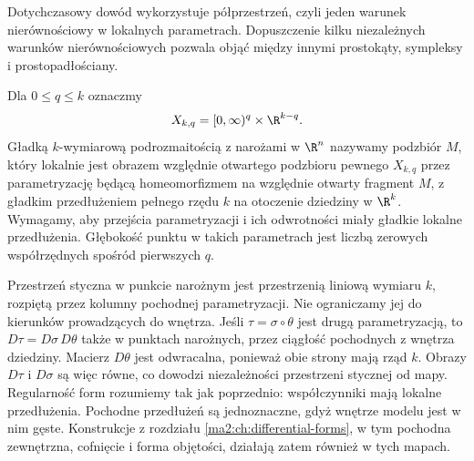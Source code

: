 Dotychczasowy dowód wykorzystuje półprzestrzeń,
czyli jeden warunek nierównościowy w lokalnych
parametrach. Dopuszczenie kilku niezależnych
warunków nierównościowych pozwala objąć między
innymi prostokąty, sympleksy i prostopadłościany.

\begin{definicja}
\label{ma2:def:stokes-corners}
Dla $0\le q\le k$ oznaczmy
\[
 X_{k,q}=[0,\infty)^q\times\R^{k-q}.
\]
Gładką $k$-wymiarową podrozmaitością z narożami
w $\R^n$ nazywamy podzbiór $M$, który lokalnie
jest obrazem względnie otwartego podzbioru
pewnego $X_{k,q}$ przez parametryzację będącą
homeomorfizmem na względnie otwarty fragment $M$,
z gładkim przedłużeniem pełnego rzędu $k$
na otoczenie dziedziny w $\R^k$.
Wymagamy, aby przejścia parametryzacji i ich
odwrotności miały gładkie lokalne przedłużenia.
Głębokość punktu w takich parametrach jest
liczbą zerowych współrzędnych spośród pierwszych $q$.
\end{definicja}

Przestrzeń styczna w punkcie narożnym jest
przestrzenią liniową wymiaru $k$, rozpiętą przez
kolumny pochodnej parametryzacji. Nie ograniczamy
jej do kierunków prowadzących do wnętrza.
Jeśli $\tau=\sigma\circ\theta$ jest drugą
parametryzacją, to $D\tau=D\sigma\,D\theta$
także w punktach narożnych, przez ciągłość
pochodnych z wnętrza dziedziny.
Macierz $D\theta$ jest odwracalna, ponieważ
obie strony mają rząd $k$.
Obrazy $D\tau$ i $D\sigma$ są więc równe,
co dowodzi niezależności przestrzeni stycznej
od mapy.
Regularność form rozumiemy tak jak poprzednio:
współczynniki mają lokalne przedłużenia.
Pochodne przedłużeń są jednoznaczne, gdyż
wnętrze modelu jest w nim gęste. Konstrukcje
z rozdziału \ref{ma2:ch:differential-forms},
w tym pochodna zewnętrzna, cofnięcie i forma
objętości, działają zatem również w tych mapach.

